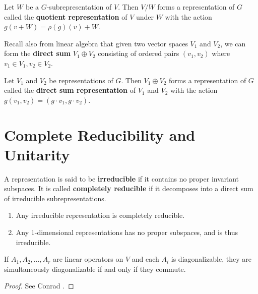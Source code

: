 \begin{defn}
Let $W$ be a $G$-subrepresentation of $V$.  Then $V/W$ forms a representation of $G$ called the \textbf{quotient representation} of $V$ under $W$ with the action $g( v + W) = \rho(g)(v) + W$.
\end{defn}

Recall also from linear algebra that given two vector spaces $V_1$ and $V_2$, we can form the \textbf{direct sum} $V_1 \oplus V_2$ consisting of ordered pairs $(v_1 ,v_2)$ where $v_1 \in V_1, v_2 \in V_2$.  

\begin{defn}
Let $V_1$ and $V_2$ be representations of $G$.  Then $V_1 \oplus V_2$ forms a representation of $G$ called the \textbf{direct sum representation} of $V_1$ and $V_2$ with the action $g (v_1, v_2) = (g \cdot  v_1, g \cdot v_2)$.
\end{defn}


\section{Complete Reducibility and Unitarity}
\begin{defn}
A representation is said to be \textbf{irreducible} if it contains no proper invariant subspaces.  It is called \textbf{completely reducible} if it decomposes into a direct sum of irreducible subrepresentations.
\end{defn}

\begin{example}
\begin{enumerate}
\item Any irreducible representation is completely reducible.
\item Any $1$-dimensional representations has no proper subspaces, and is thus irreducible.
\end{enumerate}
\end{example}

\begin{thm}\label{simultaneous} If $A_1, A_2, \ldots, A_r$ are linear operators on $V$ and each $A_i$ is diagonalizable, they are simultaneously diagonalizable if and only if they commute.
\end{thm}
\begin{proof}
 See Conrad \cite[Theorem 5.1] {ConradMinPoly}.
\end{proof}

